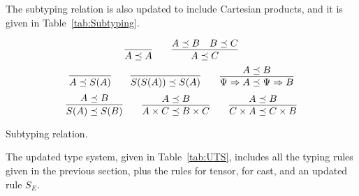 \documentclass[preprint]{elsarticle}
\newcommand\gB{\ensuremath{\Psi}}
\begin{document}
The subtyping relation is also updated to include Cartesian products, and it is
given in Table~\ref{tab:Subtyping}.
\begin{table}[!h]
  \centering
  \[
    \infer{A \preceq A}{}
    \qquad
    \infer{A \preceq C}{A \preceq B & B \preceq C}
  \]
  \[
    \infer{A\preceq S(A)}{} \qquad \infer{S(S(A))\preceq S(A)}{} \qquad
    \infer{\gB\Rightarrow A\preceq\gB\Rightarrow B}{A\preceq B}
  \]
  \[
    \infer{S(A)\preceq S(B)}{A\preceq B}
    \qquad
    \infer{A\times C\preceq B\times C}{A\preceq B}
    \qquad
    \infer{C\times A\preceq C\times B}{A\preceq B}
  \]
  \caption{Subtyping relation.}
  \label{tab:Subtyping}
\end{table}

The updated type system, given in Table~\ref{tab:UTS}, includes all the typing
rules given in the previous section, plus the rules for tensor, for cast, and an
updated rule $S_E$.
\end{document}
